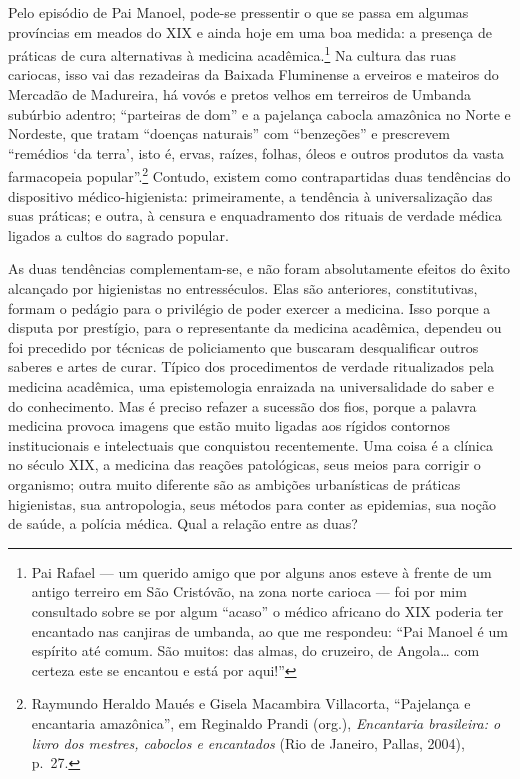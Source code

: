 Pelo episódio de Pai Manoel, pode-se pressentir o que se passa em
algumas províncias em meados do XIX e ainda hoje em uma boa medida: a
presença de práticas de cura alternativas à medicina
acadêmica.\footnote{Pai Rafael --- um querido amigo que por alguns anos
  esteve à frente de um antigo terreiro em São Cristóvão, na zona norte
  carioca --- foi por mim consultado sobre se por algum ``acaso'' o
  médico africano do XIX poderia ter encantado nas canjiras de umbanda,
  ao que me respondeu: ``Pai Manoel é um espírito até comum. São muitos:
  das almas, do cruzeiro, de Angola\dots{} com certeza este se encantou e
  está por aqui!''} Na cultura das ruas cariocas, isso vai das
rezadeiras da Baixada Fluminense a erveiros e mateiros do Mercadão de
Madureira, há vovós e pretos velhos em terreiros de Umbanda subúrbio
adentro; ``parteiras de dom'' e a pajelança cabocla amazônica no Norte e
Nordeste, que tratam ``doenças naturais'' com ``benzeções'' e prescrevem
``remédios `da terra', isto é, ervas, raízes, folhas, óleos e outros
produtos da vasta farmacopeia popular''.\footnote{Raymundo Heraldo Maués
  e Gisela Macambira Villacorta, ``Pajelança e encantaria amazônica'',
  em Reginaldo Prandi (org.), \textit{Encantaria brasileira: o livro dos
  mestres, caboclos e encantados} (Rio de Janeiro, Pallas, 2004), p.~27.}
Contudo, existem como contrapartidas duas tendências do dispositivo
médico-higienista: primeiramente, a tendência à universalização das suas
práticas; e outra, à censura e enquadramento dos rituais de verdade
médica ligados a cultos do sagrado popular.

As duas tendências complementam-se, e não foram absolutamente efeitos do
êxito alcançado por higienistas no entresséculos. Elas são anteriores,
constitutivas, formam o pedágio para o privilégio de poder exercer a
medicina. Isso porque a disputa por prestígio, para o representante da
medicina acadêmica, dependeu ou foi precedido por técnicas de
policiamento que buscaram desqualificar outros saberes e artes de curar.
Típico dos procedimentos de verdade ritualizados pela medicina
acadêmica, uma epistemologia enraizada na universalidade do saber e do
conhecimento. Mas é preciso refazer a sucessão dos fios, porque a
palavra medicina provoca imagens que estão muito ligadas aos rígidos
contornos institucionais e intelectuais que conquistou recentemente. Uma
coisa é a clínica no século XIX, a medicina das reações patológicas,
seus meios para corrigir o organismo; outra muito diferente são as
ambições urbanísticas de práticas higienistas, sua antropologia, seus
métodos para conter as epidemias, sua noção de saúde, a polícia médica.
Qual a relação entre as duas?

